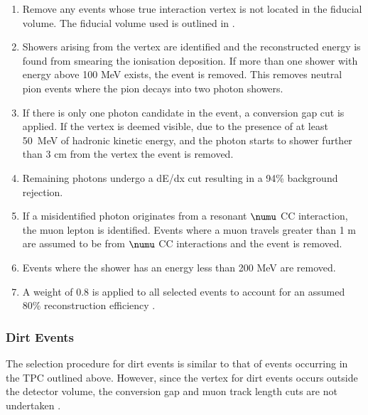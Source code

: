 \begin{enumerate}
  \item Remove any events whose true interaction vertex is not located in the fiducial volume. The fiducial volume used is outlined in .
  \item Showers arising from the vertex are identified and the reconstructed energy is found from smearing the ionisation deposition. If more than one shower with energy above 100 MeV exists, the event is removed. This removes neutral pion events where the pion decays into two photon showers. 
  \item If there is only one photon candidate in the event, a conversion gap cut is applied. If the vertex is deemed visible, due to the presence of at least \mbox{50 MeV} of hadronic kinetic energy, and the photon starts to shower further than 3 cm from the vertex the event is removed.
  \item Remaining photons undergo a dE/dx cut resulting in a 94\% background rejection.
  \item If a misidentified photon originates from a resonant $\numu$ CC interaction, the muon lepton is identified. Events where a muon travels greater than 1 m are assumed to be from $\numu$ CC interactions and the event is removed. 
  \item Events where the shower has an energy less than 200 MeV are removed.
  \item A weight of 0.8 is applied to all selected events
to account for an assumed 80\% reconstruction efficiency \cite{Dom's_thesis}.
\end{enumerate}

\subsubsection*{Dirt Events}
The selection procedure for dirt events is similar to that of events occurring in the TPC outlined above. However, since the vertex for dirt events occurs outside the detector volume, the conversion gap and muon track length cuts are not undertaken \cite{Dom's_thesis}.

